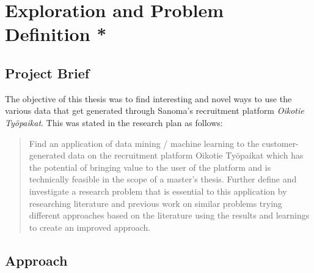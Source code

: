 
\clearpage

\section{Exploration and Problem Definition *}
\label{sec:Exploration}

\subsection{Project Brief}
\label{sub:Project Brief}

The objective of this thesis was to find interesting and novel ways to use the various data that get generated through Sanoma's  recruitment platform \emph{Oikotie Työpaikat}. This was stated in the research plan as follows:

\blockquote{Find an application of data mining / machine learning to the customer-generated data on the recruitment platform Oikotie Työpaikat which has the potential of bringing value to the user of the platform and is technically feasible in the scope of a master’s thesis. Further define and investigate a research problem that is essential to this application by researching literature and previous work on similar problems trying different approaches based on the literature using the results and learnings to create an improved approach.}






\subsection{Approach}
\label{sub:Approach}


